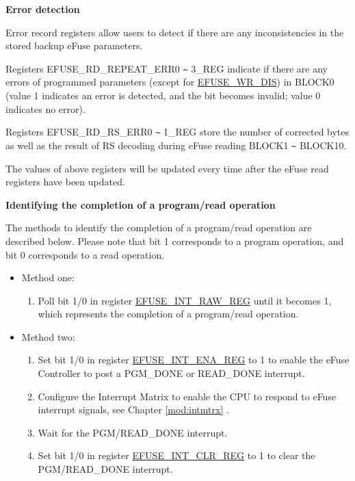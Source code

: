 \documentclass[main\_\_EN.tex]{subfiles}
\begin{document}
{\bfseries Error detection}

Error record registers allow users to detect if there are any inconsistencies in the stored backup eFuse parameters.

Registers EFUSE\_RD\_REPEAT\_ERR0 \verb+~+ 3\_REG indicate if there are any errors of programmed parameters (except for \hyperref[fielddesc:EFUSEWRDIS]{EFUSE\_WR\_DIS}) in BLOCK0 (value 1 indicates an error is detected, and the bit becomes invalid; value 0 indicates no error).

Registers EFUSE\_RD\_RS\_ERR0 \verb+~+ 1\_REG store the number of corrected bytes as well as the result of RS decoding during eFuse reading BLOCK1 \verb+~+ BLOCK10.

The values of above registers will be updated every time after the eFuse read registers have been updated.

{\bfseries Identifying the completion of a program/read operation}

    The methods to identify the completion of a program/read operation are described below. Please note that bit 1 corresponds to a program operation, and bit 0 corresponds to a read operation.
    \begin{itemize}
    \item Method one:
        \begin{enumerate}
            \item Poll bit 1/0 in register \hyperref[regdesc:EFUSEINTRAWREG]{EFUSE\_INT\_RAW\_REG} until it becomes 1, which represents the completion of a program/read operation.
        \end{enumerate}
    \item Method two:
        \begin{enumerate}
            \item Set bit 1/0 in register \hyperref[regdesc:EFUSEINTENAREG]{EFUSE\_INT\_ENA\_REG} to 1 to enable the eFuse Controller to post a PGM\_DONE or READ\_DONE interrupt.
            \item Configure the Interrupt Matrix to enable the CPU to respond to eFuse interrupt signals, see Chapter \ref{mod:intmtrx} \textit{}.
            \item Wait for the PGM/READ\_DONE interrupt.
            \item Set bit 1/0 in register \hyperref[regdesc:EFUSEINTCLRREG]{EFUSE\_INT\_CLR\_REG} to 1 to clear the PGM/READ\_DONE interrupt.
    \end{enumerate}
\end{itemize}
\end{document}
